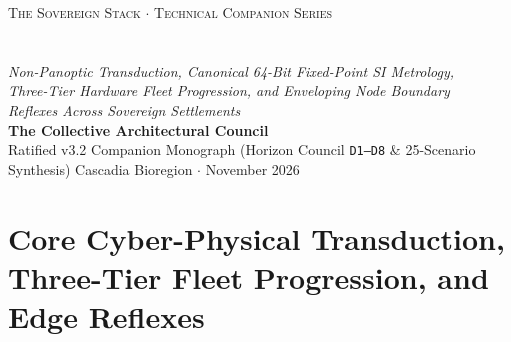 \documentclass[11pt,a4paper]{book}
\DeclareRobustCommand{\_}{\ifmmode\text{\symbol{95}}\else\symbol{95}\allowbreak\fi}
\theoremstyle{plain}
\theoremstyle{definition}
\begin{document}
\frontmatter
\begin{titlepage}
    \thispagestyle{empty}
    \begin{center}
        \vspace*{3.0cm}
        {\Large \textsc{The Sovereign Stack $\cdot$ Technical Companion Series}} \\[1.1cm]
        {} \\[0.35cm]
        {} \\[0.85cm]
        {\Large \textit{Non-Panoptic Transduction, Canonical 64-Bit Fixed-Point SI Metrology,}} \\[0.25cm]
        {\Large \textit{Three-Tier Hardware Fleet Progression, and Enveloping Node Boundary}} \\[0.25cm]
        {\Large \textit{Reflexes Across Sovereign Settlements}} \\[2.3cm]
        {\large \textbf{The Collective Architectural Council}} \\[0.4cm]
        {\normalsize Ratified v3.2 Companion Monograph (Horizon Council \texttt{D1--D8} \& 25-Scenario Synthesis)}
        \vfill
        {\large Cascadia Bioregion $\cdot$ November 2026}
        \vspace*{2.0cm}
    \end{center}
    \clearpage
\end{titlepage}

\tableofcontents



\mainmatter

\part{Core Cyber-Physical Transduction, Three-Tier Fleet Progression, and Edge Reflexes}










\end{document}
